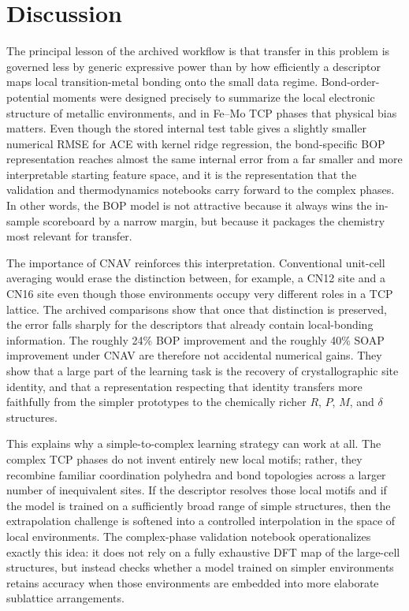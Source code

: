 \section{Discussion}
\label{sec:discussion}

The principal lesson of the archived workflow is that transfer in this problem is governed less by generic expressive power than by how efficiently a descriptor maps local transition-metal bonding onto the small data regime. Bond-order-potential moments were designed precisely to summarize the local electronic structure of metallic environments, and in Fe--Mo TCP phases that physical bias matters. Even though the stored internal test table gives a slightly smaller numerical RMSE for ACE with kernel ridge regression, the bond-specific BOP representation reaches almost the same internal error from a far smaller and more interpretable starting feature space, and it is the representation that the validation and thermodynamics notebooks carry forward to the complex phases. In other words, the BOP model is not attractive because it always wins the in-sample scoreboard by a narrow margin, but because it packages the chemistry most relevant for transfer.

The importance of CNAV reinforces this interpretation. Conventional unit-cell averaging would erase the distinction between, for example, a CN12 site and a CN16 site even though those environments occupy very different roles in a TCP lattice. The archived comparisons show that once that distinction is preserved, the error falls sharply for the descriptors that already contain local-bonding information. The roughly 24\% BOP improvement and the roughly 40\% SOAP improvement under CNAV are therefore not accidental numerical gains. They show that a large part of the learning task is the recovery of crystallographic site identity, and that a representation respecting that identity transfers more faithfully from the simpler prototypes to the chemically richer $R$, $P$, $M$, and $\delta$ structures.

This explains why a simple-to-complex learning strategy can work at all. The complex TCP phases do not invent entirely new local motifs; rather, they recombine familiar coordination polyhedra and bond topologies across a larger number of inequivalent sites. If the descriptor resolves those local motifs and if the model is trained on a sufficiently broad range of simple structures, then the extrapolation challenge is softened into a controlled interpolation in the space of local environments. The complex-phase validation notebook operationalizes exactly this idea: it does not rely on a fully exhaustive DFT map of the large-cell structures, but instead checks whether a model trained on simpler environments retains accuracy when those environments are embedded into more elaborate sublattice arrangements.

